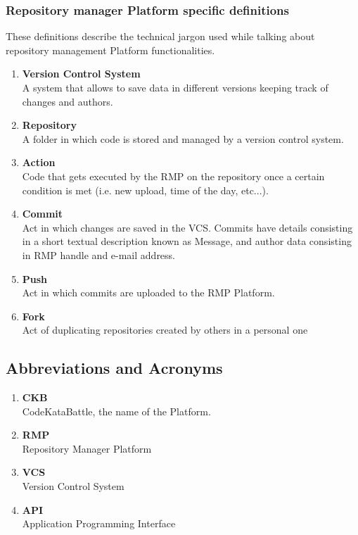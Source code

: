 \subsubsection{Repository manager Platform specific definitions}
These definitions describe the technical jargon used while talking about repository management Platform functionalities.
\begin{enumerate}[label=$\bullet$]
    \item \textbf{Version Control System}\\A system that allows to save data in different versions keeping track of changes and authors.
    \item \textbf{Repository}\\A folder in which code is stored and managed by a version control system.
    \item \textbf{Action}\\Code that gets executed by the RMP on the repository once a certain condition is met (i.e. new upload, time of the day, etc...).
    \item \textbf{Commit}\\Act in which changes are saved in the VCS. Commits have details consisting in a short textual description known as Message, and author data consisting in RMP handle and e-mail address.
    \item \textbf{Push}\\Act in which commits are uploaded to the RMP Platform.
    \item \textbf{Fork}\\Act of duplicating repositories created by others in a personal one
\end{enumerate}
\subsection{Abbreviations and Acronyms}
\begin{enumerate}[label=$\bullet$]
    \item \textbf{CKB}\\CodeKataBattle, the name of the Platform.
    \item \textbf{RMP}\\Repository Manager Platform
    \item \textbf{VCS}\\Version Control System
    \item \textbf{API}\\Application Programming Interface
\end{enumerate}

